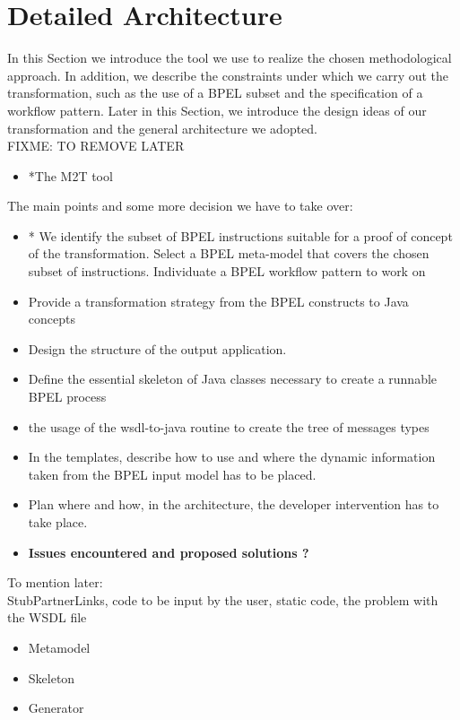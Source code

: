 \section{Detailed Architecture}
\label{DetailedArchitecture}
In this Section we introduce the tool we use to realize the chosen methodological approach. In addition, we describe the constraints under which we carry out the transformation, such as the use of a BPEL subset and the specification of a workflow pattern.
Later in this Section, we introduce the design ideas of our transformation and the general architecture we adopted.\\

FIXME: TO REMOVE LATER
\begin{itemize}
 \item *The M2T tool
\end{itemize}

The main points and some more decision we have to take over:
\begin{itemize}
  \item * We identify the subset of BPEL instructions suitable for a proof of concept of the transformation. 
  \subitem * Select a BPEL meta-model that covers the chosen subset of instructions.
  \subitem * Individuate a BPEL workflow pattern to work on 
 
 \item Provide a transformation strategy from the BPEL constructs to Java concepts
 \item Design the structure of the output application.
 \item Define the essential skeleton of Java classes necessary to create a runnable BPEL process
 \item the usage of the wsdl-to-java routine to create the tree of messages types
 \item In the templates, describe how to use and where the dynamic information taken from the BPEL input model has to be placed.
 \item Plan where and how, in the architecture, the developer intervention has to take place.
 \item \textbf{Issues encountered and proposed solutions  ?}
\end{itemize} 
 
 To mention later: \\
 StubPartnerLinks, code to be input by the user, static code, the problem with the WSDL file

\begin{itemize}
 \item Metamodel 
 \item Skeleton 
 \item Generator 
\end{itemize}

